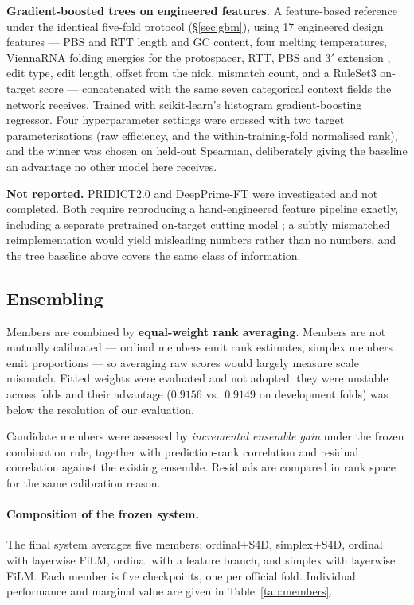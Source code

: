 \documentclass[11pt]{article}
\begin{document}
\textbf{Gradient-boosted trees on engineered features.} A feature-based reference under
the identical five-fold protocol (\S\ref{sec:gbm}), using 17 engineered design features
--- PBS and RTT length and GC content, four melting temperatures, ViennaRNA folding
energies for the protospacer, RTT, PBS and 3$'$ extension \citep{lorenz2011}, edit type,
edit length, offset from the nick, mismatch count, and a RuleSet3 on-target score
\citep{doench2016} --- concatenated with the same seven categorical context fields the
network receives. Trained with scikit-learn's histogram gradient-boosting regressor.
Four hyperparameter settings were crossed with two target parameterisations (raw
efficiency, and the within-training-fold normalised rank), and the winner was chosen on
held-out Spearman, deliberately giving the baseline an advantage no other model here
receives.

\textbf{Not reported.} PRIDICT2.0 and DeepPrime-FT were investigated and not completed.
Both require reproducing a hand-engineered feature pipeline exactly, including a
separate pretrained on-target cutting model \citep{kim2019}; a subtly mismatched
reimplementation would yield misleading numbers rather than no numbers, and the tree
baseline above covers the same class of information.

\subsection{Ensembling}
\label{sec:ensemble}

Members are combined by \textbf{equal-weight rank averaging}. Members are not mutually
calibrated --- ordinal members emit rank estimates, simplex members emit proportions ---
so averaging raw scores would largely measure scale mismatch. Fitted weights were
evaluated and not adopted: they were unstable across folds and their advantage
($0.9156$ vs.\ $0.9149$ on development folds) was below the resolution of our
evaluation.

Candidate members were assessed by \emph{incremental ensemble gain} under the frozen
combination rule, together with prediction-rank correlation and residual correlation
against the existing ensemble. Residuals are compared in rank space for the same
calibration reason.

\paragraph{Composition of the frozen system.} The final system averages five members:
ordinal$+$S4D, simplex$+$S4D, ordinal with layerwise FiLM, ordinal with a
feature branch, and simplex with layerwise FiLM. Each member is five checkpoints, one
per official fold.
Individual performance and marginal value are given in Table~\ref{tab:members}.
\end{document}
